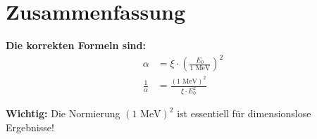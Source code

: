 \documentclass[12pt,a4paper]{article}
\theoremstyle{definition}
\begin{document}
\section*{Zusammenfassung}

\begin{tcolorbox}[colback=blue!5!white,colframe=blue!75!black]
	\textbf{Die korrekten Formeln sind:}
	\begin{align*}
		\alpha &= \xi \cdot \left(\frac{E_0}{1 \text{ MeV}}\right)^2 \\
		\frac{1}{\alpha} &= \frac{(1 \text{ MeV})^2}{\xi \cdot E_0^2}
	\end{align*}
\end{tcolorbox}

\begin{tcolorbox}[colback=red!5!white,colframe=red!75!black]
	\textbf{Wichtig:} Die Normierung $(1 \text{ MeV})^2$ ist essentiell für dimensionslose Ergebnisse!
\end{tcolorbox}
	
\end{document}
